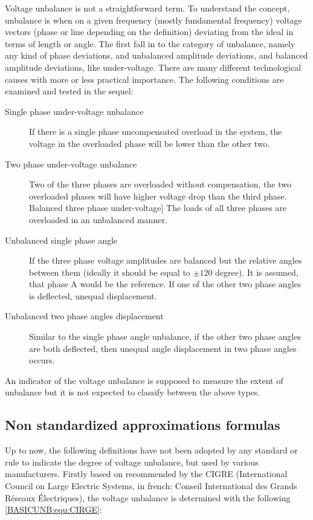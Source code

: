         Voltage unbalance is not a straightforward term. To understand the concept, unbalance is when on a given frequency (mostly fundamental frequency) voltage vectors (phase or line depending on the definition) deviating from the ideal in terms of length or angle. The first fall in to the category of unbalance, namely any kind of phase deviations, and unbalanced amplitude deviations, and balanced amplitude deviations, like under-voltage. There are many different technological causes with more or less practical importance. The following conditions are examined and tested in the sequel:
        \begin{description}
        \item[Single phase under-voltage unbalance]  If there is a single phase uncompensated overload in the system, the voltage in the overloaded phase will be lower than the other two.
        \item[Two phase under-voltage unbalance]  Two of the three phases are overloaded without compensation, the two overloaded phases will have higher voltage drop than the third phase.
        Balanced three phase under-voltage]  The loads of all three phases are overloaded in an unbalanced manner.
        \item[Unbalanced single phase angle]  If the three phase voltage amplitudes are balanced but the relative angles between them (ideally it should be equal to $\pm120$ degree). It is assumed, that phase A would be the reference. If one of the other two phase angles is deflected, unequal displacement.
        \item[Unbalanced two phase angles displacement] Similar to the single phase angle unbalance, if the other two phase angles are both deflected, then unequal angle displacement in two phase angles occurs.
        \end{description}
        An indicator of the voltage unbalance is supposed to measure the extent of unbalance but it is not expected to classify between the above types.
	
	\subsection{Non standardized approximations formulas}\label{BASICUNB:sec:ApproxFormula}
	
	Up to now, the following definitions have not been adopted by any standard or rule to indicate the degree of voltage unbalance, but used by various manufacturers. Firstly based on \cite{eugene1986new} recommended by the CIGRE (International Council on Large Electric Systems, in french: Conseil International des Grands Réseaux Électriques), the voltage unbalance is determined with the following \ref{BASICUNB:equ:CIRGE}:
	
